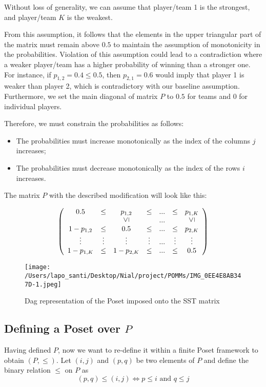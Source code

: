 \documentclass[11pt]{amsart}
\newcommand{\vertgeq}{\rotatebox{90}{$\leq$}}
\begin{document}
Without loss of generality, we can assume that player/team 1 is the strongest, and player/team $K$ is the weakest.

From this assumption, it follows that the elements in the upper triangular part of the matrix must remain above $0.5$ to maintain the assumption of monotonicity in the probabilities. Violation of this assumption could lead to a contradiction where a weaker player/team has a higher probability of winning than a stronger one. For instance, if $p_{1,2} = 0.4 \leq 0.5$, then $p_{2,1} = 0.6$ would imply that player 1 is weaker than player 2, which is contradictory with our baseline assumption. Furthermore, we set the main diagonal of matrix $P$ to $0.5$ for teams and $0$ for individual players.

Therefore, we must constrain the probabilities as follows:

\begin{itemize}
\item The probabilities must increase monotonically as the index of the columns $j$ increases;
\item The probabilities must decrease monotonically as the index of the rows $i$ increases.
\end{itemize}
The matrix $P$ with the described modification will look like this: 
\begin{center}
$$
\left(\begin{array}{ccccccc} 0.5 & \leq & p_{1,2} & \leq &  ... & \leq & p_{1,K} \\  &  & \vertgeq &  & ... &  & \vertgeq \\
1 - p_{1,2} & \leq & 0.5 & \leq & ... & \leq & p_{2,K} \\ \vdots & \vdots & \vdots & \vdots &  ... & \vdots& \vdots \\ 1 - p_{1,K}& \leq & 1 - p_{2,K}& \leq & ... & \leq & 0.5\end{array}\right)
$$
\end{center}


\begin{figure}
\begin{center}
\texttt{[image: /Users/lapo\_santi/Desktop/Nial/project/POMMs/IMG\_0EE4E8AB347D-1.jpeg]}
\caption{Dag representation of the Poset imposed onto the SST matrix}
\label{fig:DAG}
\end{center}
\end{figure}

\subsection{Defining a Poset over $P$}
Having defined $P$, now we want to re-define it within a finite Poset framework to obtain $(P, \leq)$. Let $(i,j)$ and $(p,q)$ be two elements of $P$ and define the binary relation $\leq$ on $P$ as 
\begin{equation}
(p,q) \leq (i,j)  \iff p \leq i \text{ and } q \leq j
\end{equation}
\end{document}
